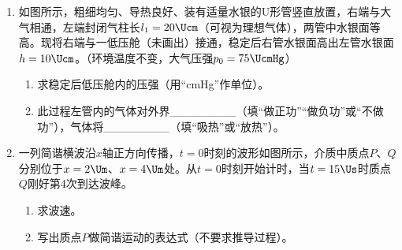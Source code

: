 \documentclass[\gkver]{gaokaozhenti}
\begin{document}
\begin{enumerate}
\item
如图所示，粗细均匀、导热良好、装有适量水银的U形管竖直放置，右端与大气相通，左端封闭气柱长$l_{1}=20\Ucm$（可视为理想气体），两管中水银面等高。现将右端与一低压舱（未画出）接通，稳定后右管水银面高出左管水银面$h=10\Ucm$。（环境温度不变，大气压强$p_{0}=75\UcmHg$）
\begin{enumerate}
	\item
	求稳定后低压舱内的压强（用“cmHg”作单位）。
	\item
	此过程左管内的气体对外界\_\_\_\_\_\_\_\_（填“做正功”“做负功”或“不做功”），气体将\_\_\_\_\_\_\_\_（填“吸热”或“放热”）。
\end{enumerate}

\item
一列简谐横波沿$x$轴正方向传播，$t=0$时刻的波形如图所示，介质中质点$P$、$Q$分别位于$x=2\Um$、$x=4\Um$处。从$t=0$时刻开始计时，当$t=15\Us$时质点$Q$刚好第4次到达波峰。
\begin{enumerate}
	\item
	求波速。
	\item
	写出质点$P$做简谐运动的表达式（不要求推导过程）。
\end{enumerate}
\jdanswer{
\begin{enumerate}
	\item
	$1\Ums$


\end{enumerate}}
\end{enumerate}
\end{document}
